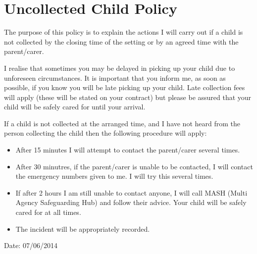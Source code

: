 

\section{Uncollected Child Policy}

The purpose of this policy is to explain the actions I will carry out if
a child is not collected by the closing time of the setting or by an
agreed time with the parent/carer.

I realise that sometimes you may be delayed in picking up your child due
to unforeseen circumstances. It is important that you inform me, as soon
as possible, if you know you will be late picking up your child. Late
collection fees will apply (these will be stated on your contract) but
please be assured that your child will be safely cared for until your
arrival.

If a child is not collected at the arranged time, and I have not heard
from the person collecting the child then the following procedure will
apply:

\begin{itemize}
\item
  After 15 minutes I will attempt to contact the parent/carer several
  times.~
\item
  After 30 minutres, if the parent/carer is unable to be contacted, I
  will contact the emergency numbers given to me. I will try this
  several times.~
\item
  If after 2 hours I am still unable to contact anyone, I will call
  MASH (Multi Agency Safeguarding Hub) and follow their advice. Your
  child will be safely cared for at all times. ~
\item
  The incident will be appropriately recorded.~
\end{itemize}

Date: 07/06/2014


